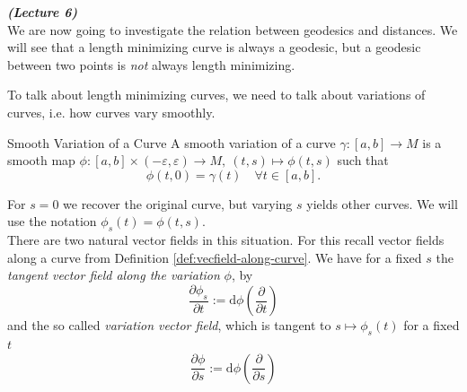 

\vspace{0.4cm}\emph{\textbf{(Lecture 6)}}\\

We are now going to investigate the relation between geodesics and distances. We will see that a length minimizing curve is always a geodesic, but a geodesic between two points is \emph{not} always length minimizing.

To talk about length minimizing curves, we need to talk about variations of curves, i.e. how curves vary smoothly.

\begin{colordef}{Smooth Variation of a Curve}{}
A smooth variation of a curve $\gamma: [a,b] \to M$ is a smooth map $\phi: [a,b] \times (-\varepsilon, \varepsilon) \to M,\ (t,s)\mapsto \phi(t,s)$ such that
\[
\phi(t, 0) = \gamma(t) \quad \forall t \in [a,b].
\]
\end{colordef}

\begin{center}
\end{center}

For $s=0$ we recover the original curve, but varying $s$ yields other curves. We will use the notation $\phi_s(t) = \phi(t,s)$.\\

There are two natural vector fields in this situation. For this recall vector fields along a curve from Definition \ref{def:vecfield-along-curve}. We have for a fixed $s$ the \emph{tangent vector field along the variation} $\phi$, by
\begin{equation}
    \label{eq:variation_tangent_vector_field}
    \frac{\partial \phi_s}{\partial t} := \mathrm{d}\phi\left(\frac{\partial}{\partial t}\right) 
\end{equation}
and the so called \emph{variation vector field}, which is tangent to $s\mapsto\phi_s(t)$ for a fixed $t$
\begin{equation}    
    \label{eq:variation_vector_field}
    \frac{\partial \phi}{\partial s} := \mathrm{d}\phi\left(\frac{\partial}{\partial s}\right)
\end{equation}

